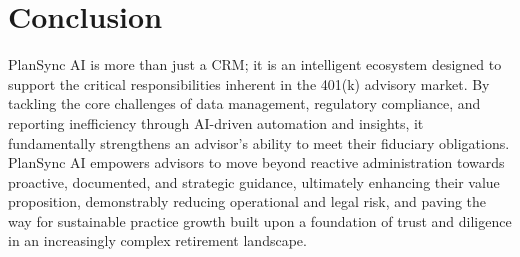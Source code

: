 \documentclass[11pt]{article} %
\begin{document}
\section{Conclusion}
PlanSync AI is more than just a CRM; it is an intelligent ecosystem designed to support the critical responsibilities inherent in the 401(k) advisory market. By tackling the core challenges of data management, regulatory compliance, and reporting inefficiency through AI-driven automation and insights, it fundamentally strengthens an advisor's ability to meet their fiduciary obligations. PlanSync AI empowers advisors to move beyond reactive administration towards proactive, documented, and strategic guidance, ultimately enhancing their value proposition, demonstrably reducing operational and legal risk, and paving the way for sustainable practice growth built upon a foundation of trust and diligence in an increasingly complex retirement landscape.
\end{document}
